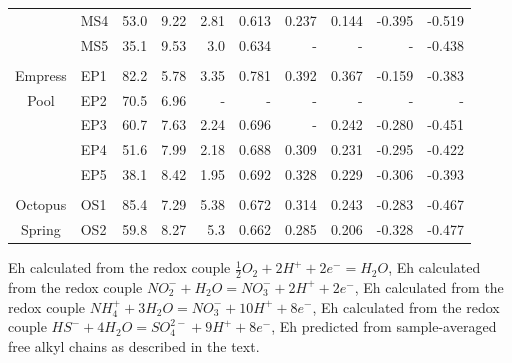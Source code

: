 \begin{landscape}
\begin{table}
\begin{adjustbox}{width=\textheight,keepaspectratio}
\begin{threeparttable}
\begin{tabular}{clrrrrrrrr}
      & MS4   & 53.0  & 9.22  & 2.81  & 0.613 & 0.237 & 0.144 & -0.395 & -0.519 \\
      & MS5   & 35.1  & 9.53  & 3.0   & 0.634 & -     & -     & -     & -0.438 \\
      &       &       &       &       &       &       &       &       &  \\
Empress & EP1   & 82.2  & 5.78  & 3.35  & 0.781 & 0.392 & 0.367 & -0.159 & -0.383 \\
Pool  & EP2   & 70.5  & 6.96  & -     & -     & -     & -     & -     & - \\
      & EP3   & 60.7  & 7.63  & 2.24  & 0.696 & -     & 0.242 & -0.280 & -0.451 \\
      & EP4   & 51.6  & 7.99  & 2.18  & 0.688 & 0.309 & 0.231 & -0.295 & -0.422 \\
      & EP5   & 38.1  & 8.42  & 1.95  & 0.692 & 0.328 & 0.229 & -0.306 & -0.393 \\
      &       &       &       &       &       &       &       &       &  \\
Octopus & OS1   & 85.4  & 7.29  & 5.38  & 0.672 & 0.314 & 0.243 & -0.283 & -0.467 \\
Spring & OS2   & 59.8  & 8.27  & 5.3   & 0.662 & 0.285 & 0.206 & -0.328 & -0.477 \\
\bottomrule
\end{tabular}%




  
  \begin{tablenotes}
     Eh calculated from the redox couple $\frac{1}{2}O_{2} + 2H^{+} + 2e^{-} = H_{2}O$,
     Eh calculated from the redox couple $NO_{2}^{-} + H_{2}O = NO_{3}^{-}+ 2H^{+} + 2e^{-}$,
     Eh calculated from the redox couple $NH_{4}^{+} + 3H_{2}O = NO_{3}^{-}+ 10H^{+} + 8e^{-}$,
     Eh calculated from the redox couple $HS^{-} + 4H_{2}O = SO_{4}^{2-}+ 9H^{+} + 8e^{-}$,
     Eh predicted from sample-averaged free alkyl chains as described in the text.
    
        
  \end{tablenotes}
  
  \label{tab:eh_results}
  \end{threeparttable}
  \end{adjustbox}
\end{table}

\setcounter{tabcounter}{0} %
\doublespace
\end{landscape}


